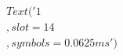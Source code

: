 \documentclass[preview]{standalone}
\begin{document}
\begin{align*}
Text('1\\,slot = 14\\, symbols = 0.0625 ms')
\end{align*}
\end{document}

